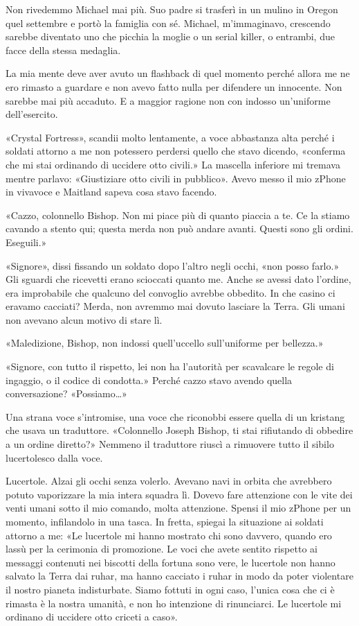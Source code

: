 Non rivedemmo Michael mai più. Suo padre si trasferì in un mulino in
Oregon quel settembre e portò la famiglia con sé. Michael, m'immaginavo,
crescendo sarebbe diventato uno che picchia la moglie o un serial
killer, o entrambi, due facce della stessa medaglia.

La mia mente deve aver avuto un flashback di quel momento perché allora
me ne ero rimasto a guardare e non avevo fatto nulla per difendere un
innocente. Non sarebbe mai più accaduto. E a maggior ragione non con
indosso un'uniforme dell'esercito.

\hfill\break

«Crystal Fortress», scandii molto lentamente, a voce abbastanza alta
perché i soldati attorno a me non potessero perdersi quello che stavo
dicendo, «conferma che mi stai ordinando di uccidere otto civili.» La
mascella inferiore mi tremava mentre parlavo: «Giustiziare otto civili
in pubblico». Avevo messo il mio zPhone in vivavoce e Maitland sapeva
cosa stavo facendo.

«Cazzo, colonnello Bishop. Non mi piace più di quanto piaccia a te. Ce
la stiamo cavando a stento qui; questa merda non può andare avanti.
Questi sono gli ordini. Eseguili.»

«Signore», dissi fissando un soldato dopo l'altro negli occhi, «non
posso farlo.» Gli sguardi che ricevetti erano scioccati quanto me. Anche
se avessi dato l'ordine, era improbabile che qualcuno del convoglio
avrebbe obbedito. In che casino ci eravamo cacciati? Merda, non avremmo
mai dovuto lasciare la Terra. Gli umani non avevano alcun motivo di
stare lì.

«Maledizione, Bishop, non indossi quell'uccello sull'uniforme per
bellezza.»

«Signore, con tutto il rispetto, lei non ha l'autorità per scavalcare le
regole di ingaggio, o il codice di condotta.» Perché cazzo stavo avendo
quella conversazione? «Possiamo\ldots»

Una strana voce s'intromise, una voce che riconobbi essere quella di un
kristang che usava un traduttore. «Colonnello Joseph Bishop, ti stai
rifiutando di obbedire a un ordine diretto?» Nemmeno il traduttore
riuscì a rimuovere tutto il sibilo lucertolesco dalla voce.

Lucertole. Alzai gli occhi senza volerlo. Avevano navi in orbita che
avrebbero potuto vaporizzare la mia intera squadra lì. Dovevo fare
attenzione con le vite dei venti umani sotto il mio comando, molta
attenzione. Spensi il mio zPhone per un momento, infilandolo in una
tasca. In fretta, spiegai la situazione ai soldati attorno a me: «Le
lucertole mi hanno mostrato chi sono davvero, quando ero lassù per la
cerimonia di promozione. Le voci che avete sentito rispetto ai messaggi
contenuti nei biscotti della fortuna sono vere, le lucertole non hanno
salvato la Terra dai ruhar, ma hanno cacciato i ruhar in modo da poter
violentare il nostro pianeta indisturbate. Siamo fottuti in ogni caso,
l'unica cosa che ci è rimasta è la nostra umanità, e non ho intenzione
di rinunciarci. Le lucertole mi ordinano di uccidere otto criceti a
caso».

